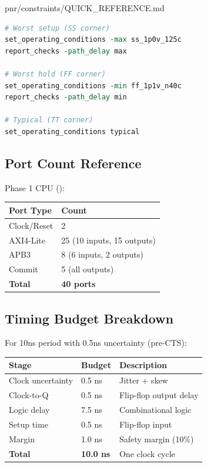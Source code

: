 \begin{relocated}{pnr/constraints/QUICK_REFERENCE.md}
\begin{lstlisting}[language=tcl]
# Worst setup (SS corner)
set_operating_conditions -max ss_1p0v_125c
report_checks -path_delay max

# Worst hold (FF corner)
set_operating_conditions -min ff_1p1v_n40c
report_checks -path_delay min

# Typical (TT corner)
set_operating_conditions typical
\end{lstlisting}

\subsection{Port Count Reference}\label{tm:pd:constraints-quick-reference:port-count-reference}

Phase 1 CPU ():

{
\begin{longtable}[]{@{}ll@{}}
\toprule\noalign{}
Port Type & Count \\
\midrule\noalign{}
\endhead
\bottomrule\noalign{}
\endlastfoot
Clock/\allowbreak{}Reset & 2 \\
AXI4-Lite & 25 (10 inputs, 15 outputs) \\
APB3 & 8 (6 inputs, 2 outputs) \\
Commit & 5 (all outputs) \\
\textbf{Total} & \textbf{40 ports} \\
\end{longtable}
}

\subsection{Timing Budget Breakdown}\label{tm:pd:constraints-quick-reference:timing-budget-breakdown}

For 10ns period with 0.5ns uncertainty (pre-CTS):

{
\begin{longtable}[]{@{}lll@{}}
\toprule\noalign{}
Stage & Budget & Description \\
\midrule\noalign{}
\endhead
\bottomrule\noalign{}
\endlastfoot
Clock uncertainty & 0.5 ns & Jitter + skew \\
Clock-to-Q & 0.5 ns & Flip-flop output delay \\
Logic delay & 7.5 ns & Combinational logic \\
Setup time & 0.5 ns & Flip-flop input \\
Margin & 1.0 ns & Safety margin (10\%) \\
\textbf{Total} & \textbf{10.0 ns} & One clock cycle \\
\end{longtable}
}


\end{relocated}
